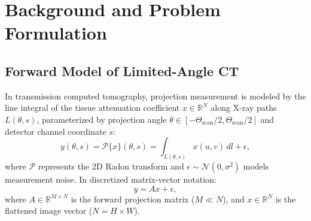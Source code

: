 \documentclass[runningheads]{llncs}
\begin{document}
\section{Background and Problem Formulation}
\label{sec:background}

\subsection{Forward Model of Limited-Angle CT}
In transmission computed tomography, projection measurement is modeled by the line integral of the tissue attenuation coefficient $x \in \mathbb{R}^{N}$ along X-ray paths $L(\theta, s)$, parameterized by projection angle $\theta \in [-\Theta_{\text{scan}}/2, \Theta_{\text{scan}}/2]$ and detector channel coordinate $s$:
\begin{equation}
y(\theta, s) = \mathcal{P}\{x\}(\theta, s) = \int_{L(\theta, s)} x(u, v) \, dl + \epsilon,
\label{eq:radon}
\end{equation}
where $\mathcal{P}$ represents the 2D Radon transform \cite{radon1917} and $\epsilon \sim \mathcal{N}(0, \sigma^2)$ models measurement noise. In discretized matrix-vector notation:
\begin{equation}
y = A x + \epsilon,
\label{eq:discrete_forward}
\end{equation}
where $A \in \mathbb{R}^{M \times N}$ is the forward projection matrix ($M \ll N$), and $x \in \mathbb{R}^{N}$ is the flattened image vector ($N = H \times W$).
\end{document}
